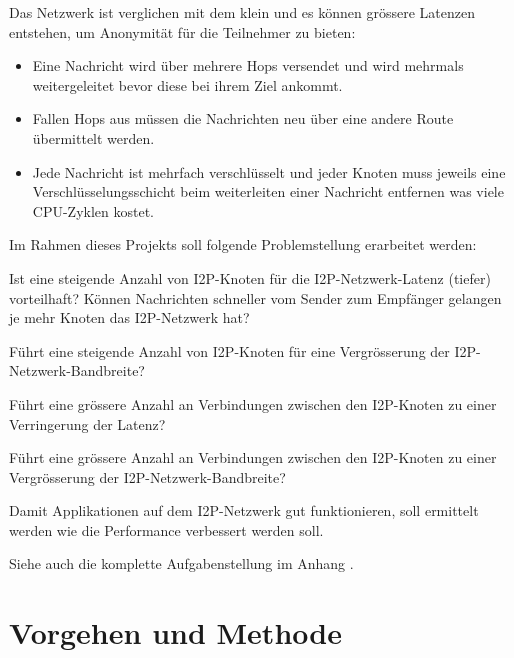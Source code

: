 Das Netzwerk ist verglichen mit dem  klein und es können grössere Latenzen entstehen, um Anonymität für die Teilnehmer zu bieten:

\begin{itemize}
    \item Eine Nachricht wird über mehrere Hops versendet und wird mehrmals weitergeleitet bevor diese bei ihrem Ziel ankommt.
    \item Fallen Hops aus müssen die Nachrichten neu über eine andere Route übermittelt werden.
    \item Jede Nachricht ist mehrfach verschlüsselt und jeder Knoten muss jeweils eine Verschlüsselungsschicht beim weiterleiten einer Nachricht entfernen was viele CPU-Zyklen kostet.
\end{itemize}


Im Rahmen dieses Projekts soll folgende Problemstellung erarbeitet werden:

\begin{hyp} \label{hyp:first}
    Ist eine steigende Anzahl von I2P-Knoten für die I2P-Netzwerk-Latenz (tiefer) vorteilhaft?
    Können Nachrichten schneller vom Sender zum Empfänger gelangen je mehr Knoten das I2P-Netzwerk hat?
\end{hyp}

\begin{hyp} \label{hyp:second}
    Führt eine steigende Anzahl von I2P-Knoten für eine Vergrösserung der I2P-Netzwerk-Bandbreite?
\end{hyp}

\begin{hyp} \label{hyp:third}
    Führt eine grössere Anzahl an Verbindungen zwischen den I2P-Knoten zu einer Verringerung der Latenz?
\end{hyp}

\begin{hyp} \label{hyp:fourth}
    Führt eine grössere Anzahl an Verbindungen zwischen den I2P-Knoten zu einer Vergrösserung der I2P-Netzwerk-Bandbreite?
\end{hyp}

Damit Applikationen auf dem I2P-Netzwerk gut funktionieren, soll ermittelt werden wie die Performance
verbessert werden soll.

Siehe auch die komplette Aufgabenstellung im Anhang .

\section{Vorgehen und Methode}


